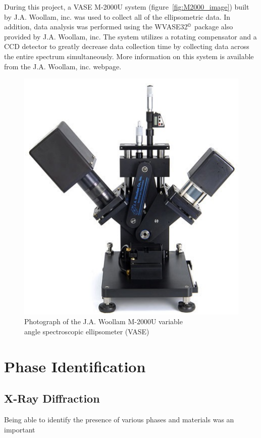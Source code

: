 During this project, a VASE M-2000U system (figure~\vref{fig:M2000_image}) built by J.A. Woollam, inc. was used to collect all of the ellipsometric data. In addition, data analysis was performed using the WVASE32{$^{\copyright}$} package also provided by J.A. Woollam, inc. The system utilizes a rotating compensator and a CCD detector to greatly decrease data collection time by collecting data across the entire spectrum simultaneously.  More information on this system is available from the J.A. Woollam, inc. webpage.\cite{woollam-web}

\begin{figure}[htbp]
   \centering
   \includegraphics[width=0.5\linewidth]{./figures/characterization/M2000_ellipsometer_image.png} 
   \caption[J.A. Woollam M-2000U Ellipsometer]%
   		{Photograph of the J.A. Woollam M-2000U variable \\%
   		 angle spectroscopic ellipsometer (VASE)}
   \label{fig:M2000_image}
\end{figure}


	
\section{Phase Identification}
\label{sec:Charact-PhaseID}


\subsection{X-Ray Diffraction}

Being able to identify the presence of various phases and materials was an important 

